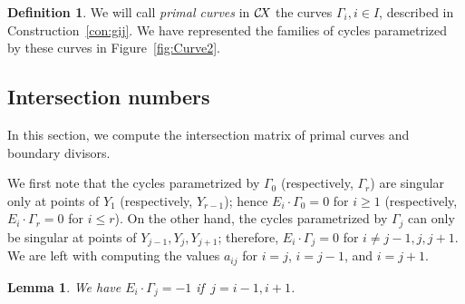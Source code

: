 \documentclass[10pt,a4paper]{article}
\numberwithin{equation}{section}
\newtheorem{lemma}[theorem]{Lemma}
\theoremstyle{definition}
\newtheorem{definition}[theorem]{Definition}
\theoremstyle{remark}
\def\CX{\mathcal{C}\!X\hspace{-0.5pt}}
\begin{document}
\begin{definition}\label{def:curves}
We will call {\em primal curves} in $\CX$ the curves $\Gamma_i, i \in I$, described in Construction~\ref{con:gij}. We have represented the families of cycles parametrized by these curves in Figure~\ref{fig:Curve2}.
\end{definition}

\subsection{Intersection numbers}

In this section, we compute the intersection matrix of primal curves and boundary divisors. 

We first note that the cycles parametrized by $\Gamma_0$ (respectively, $\Gamma_r$) are singular only at points of $Y_1$ (respectively, $Y_{r-1}$); hence $ E_i\cdot\Gamma_{0}=0$ for $i\geq 1$ (respectively, $E_i\cdot\Gamma_{r}=0$ for $i\leq r$). On the other hand, the cycles parametrized by $\Gamma_j$ can only be singular at points of $Y_{j-1},Y_j,Y_{j+1}$; therefore, $E_i\cdot \Gamma_j=0$ for $i\neq j-1,j,j+1$.  We are left with computing the values $a_{ij}$ for $i=j$, $i=j-1$, and $i=j+1$.

\begin{lemma}\label{rem:intnumbers2}
We have $E_i\cdot\Gamma_j=-1$ if\, $j=i-1,i+1$.
\end{lemma}
\end{document}
